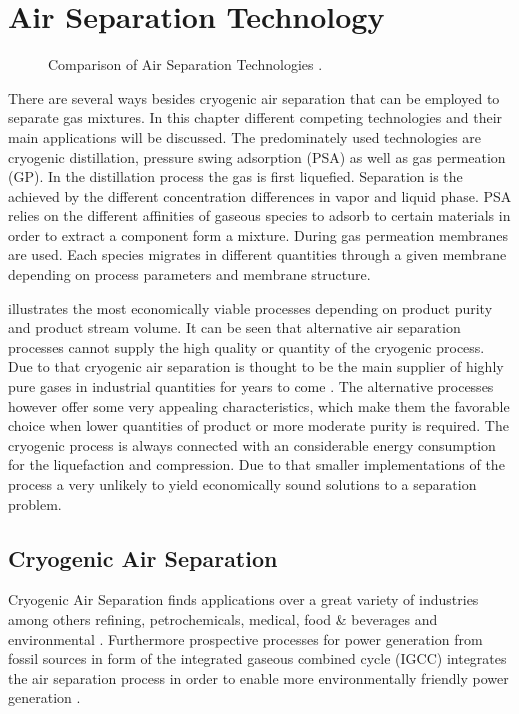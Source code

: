 \chapter{Air Separation Technology}
\label{chp:airsep}
\begin{figure}[h]
	
	\caption{Comparison of Air Separation Technologies \cite{Prasad.1994}.}
	\label{fig:tech_compar}
\end{figure}

There are several ways besides cryogenic air separation that can be employed to separate gas mixtures. 
In this chapter different competing technologies and their main applications will be discussed. The 
predominately used technologies are cryogenic distillation, pressure swing adsorption (PSA) as well as 
gas permeation (GP). In the distillation process the gas is first liquefied. Separation is the achieved 
by the different concentration differences in vapor and liquid phase. PSA relies on the different affinities 
of gaseous species to adsorb to certain materials in order to extract a component form a mixture. During gas 
permeation membranes are used. Each species migrates in different quantities through a given membrane
depending on process parameters and membrane structure. 

 illustrates the most economically viable processes depending on product
purity and product stream volume. It can be seen that alternative air separation processes 
cannot supply the high quality or quantity of the cryogenic process. Due to that cryogenic air separation is 
thought to be the main supplier of highly pure gases in industrial quantities for years to come \cite{Castle.2002}. 
The alternative processes however offer some very appealing characteristics, which make them the 
favorable choice when lower quantities of product or more moderate purity is required. The cryogenic 
process is always connected with an considerable energy consumption for the liquefaction and compression. 
Due to that smaller implementations of the process a very unlikely to yield economically sound solutions
to a separation problem. 

\addref

\section{Cryogenic Air Separation}
\label{sec:cryo_air_sep}
Cryogenic Air Separation finds applications over a great variety of industries among others refining, petrochemicals, medical, food \& beverages and environmental \cite{Sirdeshpande.2005}. Furthermore 
prospective processes for power generation from fossil sources in form of the integrated gaseous combined 
cycle (IGCC) integrates the air separation process in order to enable more environmentally friendly power 
generation \cite{Mahapatra.2010}. 


